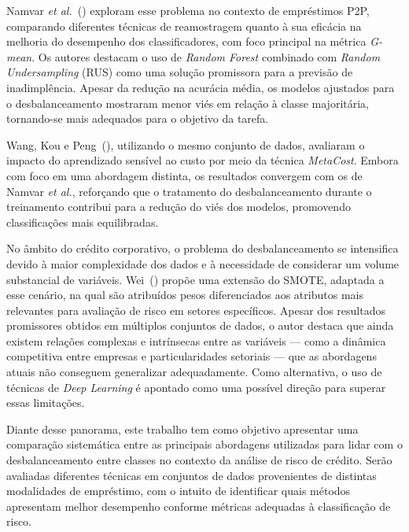 Namvar \textit{et al.}~(\citeyear{Namvar2018}) exploram esse problema no contexto de empréstimos P2P, comparando diferentes técnicas de reamostragem quanto à sua eficácia na melhoria do desempenho dos classificadores, com foco principal na métrica \textit{G-mean}. Os autores destacam o uso de \textit{Random Forest} combinado com \textit{Random Undersampling} (RUS) como uma solução promissora para a previsão de inadimplência. Apesar da redução na acurácia média, os modelos ajustados para o desbalanceamento mostraram menor viés em relação à classe majoritária, tornando-se mais adequados para o objetivo da tarefa.

Wang, Kou e Peng~(\citeyear{Namvar2018}), utilizando o mesmo conjunto de dados, avaliaram o impacto do aprendizado sensível ao custo por meio da técnica \textit{MetaCost}. Embora com foco em uma abordagem distinta, os resultados convergem com os de Namvar \textit{et al.}, reforçando que o tratamento do desbalanceamento durante o treinamento contribui para a redução do viés dos modelos, promovendo classificações mais equilibradas.

No âmbito do crédito corporativo, o problema do desbalanceamento se intensifica devido à maior complexidade dos dados e à necessidade de considerar um volume substancial de variáveis. Wei~(\citeyear{Wei2025}) propõe uma extensão do SMOTE, adaptada a esse cenário, na qual são atribuídos pesos diferenciados aos atributos mais relevantes para avaliação de risco em setores específicos. Apesar dos resultados promissores obtidos em múltiplos conjuntos de dados, o autor destaca que ainda existem relações complexas e intrínsecas entre as variáveis — como a dinâmica competitiva entre empresas e particularidades setoriais — que as abordagens atuais não conseguem generalizar adequadamente. Como alternativa, o uso de técnicas de \textit{Deep Learning} é apontado como uma possível direção para superar essas limitações.

Diante desse panorama, este trabalho tem como objetivo apresentar uma comparação sistemática entre as principais abordagens utilizadas para lidar com o desbalanceamento entre classes no contexto da análise de risco de crédito. Serão avaliadas diferentes técnicas em conjuntos de dados provenientes de distintas modalidades de empréstimo, com o intuito de identificar quais métodos apresentam melhor desempenho conforme métricas adequadas à classificação de risco.
